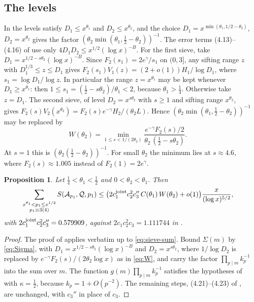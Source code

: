 \documentclass[11pt,a4paper]{amsart}
\newtheorem{proposition}[theorem]{Proposition}
\theoremstyle{remark}
\numberwithin{equation}{section}
\newcommand{\eg}{e^{\gamma}}
\begin{document}
\subsection{The levels}
In \cite{NX} the levels satisfy $D_1\le x^{\theta_1}$ and $D_2\le x^{\theta_2}$, and the choice
$D_1=x^{\min(\theta_1,1/2-\theta_2)}$, $D_2=x^{\theta_2}$ gives the factor
$(\theta_2\min(\theta_1,\frac12-\theta_2))^{-1}$. The error terms (4.13)--(4.16) of \cite{NX} use
only $4D_1D_2\le x^{1/2}(\log x)^{-B}$. For the first sieve, take $D_1=x^{1/2-s\theta_2}(\log x)^{-B}$. Since $F_2(s_1)=2\eg/s_1$ on $(0,3]$, any sifting
range $z$ with $D_1^{1/3}\le z\le D_1$ gives $F_2(s_1)V_1(z)=(2+o(1))H_1/\log D_1$, where $s_1=\log D_1/\log z$. In
particular the range $z=x^{\theta_1}$ may be kept whenever $D_1\ge x^{\theta_1}$: then
$1\le s_1=(\frac12-s\theta_2)/\theta_1<2$, because $\theta_1>\frac14$. Otherwise take $z=D_1$.
The second sieve, of level $D_2=x^{s\theta_2}$ with $s\ge1$ and sifting range $x^{\theta_2}$, gives
$F_2(s)V_2(x^{\theta_2})=F_2(s)e^{-\gamma}H_2/(\theta_2L)$. Hence $(\theta_2\min(\theta_1,\frac12-\theta_2))^{-1}$
may be replaced by
\begin{equation}\label{eq:W}
W(\theta_2)=\min_{1\le s<1/(2\theta_2)}\frac{e^{-\gamma}F_2(s)/2}{\theta_2\,(\frac12-s\theta_2)} .
\end{equation}
At $s=1$ this is $(\theta_2(\frac12-\theta_2))^{-1}$. For small $\theta_2$ the minimum lies at $s\approx4.6$, where
$F_2(s)\approx1.005$ instead of $F_2(1)=2\eg$.

\begin{proposition}\label{prop:switch}
Let $\frac14<\theta_1<\frac12$ and $0<\theta_2<\theta_1$. Then
\[
\sum_{\substack{x^{\theta_1}<p_1\le x^{1/2}\\p_1\equiv3(4)}}S(\mathcal A_{p_1},\mathcal Q,p_1)\le
\bigl(2c_1^{\rm joint}c_2^2c_3''\,C(\theta_1)\,W(\theta_2)+o(1)\bigr)\frac{x}{(\log x)^{5/2}},
\]
with $2c_1^{\rm joint}c_2^2c_3''=0.579909$, against $2c_1c_2^2c_3=1.111744$ in \cite[Proposition~4.2]{NX}.
\end{proposition}

\begin{proof}
The proof of \cite[Proposition~4.2]{NX} applies verbatim up to \eqref{eq:sieve-sum}. Bound $\Sigma(m)$ by
\eqref{eq:Sigma}, with $D_1=x^{1/2-s\theta_2}(\log x)^{-B}$ and $D_2=x^{s\theta_2}$, where $1/\log D_2$ is replaced
by $e^{-\gamma}F_2(s)/(2\theta_2\log x)$ as in \eqref{eq:W}, and carry the factor
$\prod_{p\mid m}k_p^{-1}$ into the sum over $m$. The function $g(m)\prod_{p\mid m}k_p^{-1}$ satisfies the hypotheses
of \cite[Proposition~A.3]{Martin} with $\kappa=\frac12$, because $k_p=1+O(p^{-2})$. The remaining steps,
(4.21)--(4.23) of \cite{NX}, are unchanged, with $c_3''$ in place of $c_3$.
\end{proof}
\end{document}
